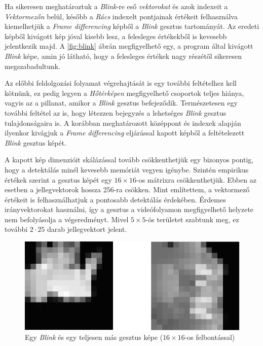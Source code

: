 Ha sikeresen meghatároztuk a \textit{Blink}-re eső \textit{vektorokat} és azok indexeit a \textit{Vektormezőn} belül, később a \textit{Rács} indexelt pontjainak értékeit felhasználva kiemelhetjük a \textit{Frame differencing} képből a \textit{Blink} gesztus tartományát. Az eredeti képből kivágott kép jóval kisebb lesz, a felesleges értékekből is kevesebb jelentkezik majd. A \ref{fig:blink} ábrán megfigyelhető egy, a program által kivágott \textit{Blink} képe, amin jó látható, hogy a felesleges értékek nagy részétől sikeresen megszabadultunk.

Az előbbi feldolgozási folyamat végrehajtását is egy további feltételhez kell kötnünk, ez pedig legyen a \textit{Hőtérképen} megfigyelhető csoportok teljes hiánya, vagyis az a pillanat, amikor a \textit{Blink} gesztus befejeződik. Természetesen egy további feltétel az is, hogy létezzen bejegyzés a lehetséges \textit{Blink} gesztus tulajdonságaira is. A korábban meghatározott középpont és indexek alapján ilyenkor kivágjuk a \textit{Frame differencing} eljárással kapott képből a feltételezett \textit{Blink} gesztus képét.

A kapott kép dimenzióit skálázással tovább csökkenthetjük egy bizonyos pontig, hogy a detektálás minél kevesebb memóriát vegyen igénybe. Szintén empirikus értékek szerint a gesztus képét egy $16\times16$-os mátrixra csökkenthetjük. Ebben az esetben a jellegvektorok hossza 256-ra csökken. Mint említettem, a vektormező értékeit is felhasználhatjuk a pontosabb detektálás érdekében. Érdemes irányvektorokat használni, így a gesztus a videófolyamon megfigyelhető helyzete nem befolyásolja a végeredményt. Mivel $5\times5$-ös területet szabtunk meg, ez további $2\cdot 25$ darab jellegvektort jelent.
\begin{figure}[h]
\centering
\includegraphics[width=7.00truecm]{images/blink-not_blink.png}
\caption{Egy \textit{Blink} és egy teljesen más gesztus képe ($16\times16$-os felbontással)}
\label{fig:blinkvsnotblink}
\end{figure}

